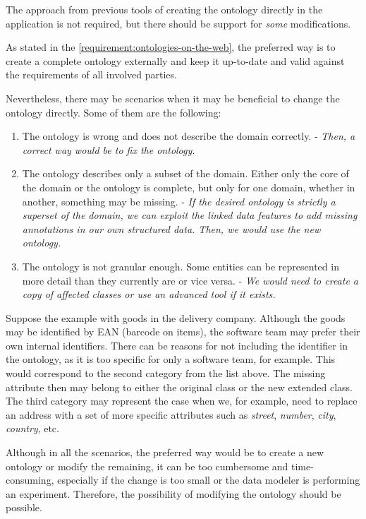 \begin{requirement}
  \label{requirement:pim-editing}
  The approach from previous tools of creating the ontology directly in the application is not required, but there should be support for \textit{some} modifications.
\end{requirement}

As stated in the \autoref{requirement:ontologies-on-the-web}, the preferred way is to create a complete ontology externally and keep it up-to-date and valid against the requirements of all involved parties.

Nevertheless, there may be scenarios when it may be beneficial to change the ontology directly. Some of them are the following:

\begin{enumerate}
  \item The ontology is wrong and does not describe the domain correctly. - \textit{Then, a correct way would be to fix the ontology.}
  \item The ontology describes only a subset of the domain. Either only the core of the domain or the ontology is complete, but only for one domain, whether in another, something may be missing. - \textit{If the desired ontology is strictly a superset of the domain, we can exploit the linked data features to add missing annotations in our own structured data. Then, we would use the new ontology.}
  \item The ontology is not granular enough. Some entities can be represented in more detail than they currently are or vice versa. - \textit{We would need to create a copy of affected classes or use an advanced tool if it exists.}
\end{enumerate}

Suppose the example with goods in the delivery company. Although the goods may be identified by EAN (barcode on items), the software team may prefer their own internal identifiers. There can be reasons for not including the identifier in the ontology, as it is too specific for only a software team, for example. This would correspond to the second category from the list above. The missing attribute then may belong to either the original class or the new extended class. The third category may represent the case when we, for example, need to replace an address with a set of more specific attributes such as \textit{street}, \textit{number}, \textit{city}, \textit{country}, etc.

Although in all the scenarios, the preferred way would be to create a new ontology or modify the remaining, it can be too cumbersome and time-consuming, especially if the change is too small or the data modeler is performing an experiment. Therefore, the possibility of modifying the ontology should be possible.

